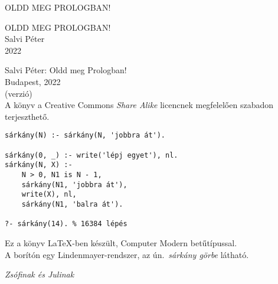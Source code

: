 \documentclass[a5paper]{book}
\theoremstyle{definition}
\begin{document}
\frontmatter
{}



\thispagestyle{empty}
\newpage

\begin{titlepage}
\thispagestyle{empty}
\centering
\vspace*{2cm}
{\large OLDD MEG PROLOGBAN!}
\end{titlepage}

\thispagestyle{empty}
\newpage

\begin{titlepage}
\centering
\vspace*{2cm}
{\Large OLDD MEG PROLOGBAN!}\\
\vspace{8cm}
{\large Salvi Péter}\\
\vspace{1em}
2022
\end{titlepage}

\thispagestyle{empty}
\begin{center}
  \small
  Salvi Péter: Oldd meg Prologban!\\
  Budapest, 2022\\(verzió)\\
  \bigskip
  A könyv a Creative Commons \emph{Share Alike} licencnek megfelelően
  szabadon terjeszthető.
\end{center}
\vfill
\begin{center}
\begin{BVerbatim}
sárkány(N) :- sárkány(N, 'jobbra át').

sárkány(0, _) :- write('lépj egyet'), nl.
sárkány(N, X) :-
    N > 0, N1 is N - 1,
    sárkány(N1, 'jobbra át'),
    write(X), nl,
    sárkány(N1, 'balra át').

?- sárkány(14). %
\end{BVerbatim}
\end{center}
\vfill
{\footnotesize Ez a könyv \LaTeX-ben készült, Computer Modern betűtípussal.\\
  A borítón egy Lindenmayer-rendszer, az ún.~\emph{sárkány görbe} látható.
}

\clearpage
\thispagestyle{empty}
\begin{center}
  \vspace*{\fill}
  {\Large\emph{Zsófinak és Julinak}}
  \vspace*{\fill}
\end{center}
\clearpage

\thispagestyle{empty}
\newpage

\addtocounter{page}{2}

\tableofcontents



\mainmatter
{}









\backmatter





\printindex
\end{document}
